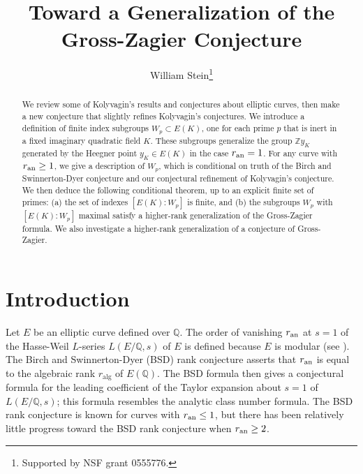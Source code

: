 \documentclass{oupau}
\DeclareMathOperator{\alg}{alg}
\newcommand{\an}{{\rm an}}
\newcommand{\QQ}{\mathbb{Q}}
\newcommand{\ZZ}{\mathbb{Z}}
\begin{document}

\title{Toward a Generalization of the Gross-Zagier Conjecture} \author{William
  Stein\footnote{Supported by NSF grant 0555776.}}
\address{}


\begin{abstract}
 
  We review some of Kolyvagin's results and conjectures about elliptic
  curves, then make a new conjecture that slightly refines Kolyvagin's
  conjectures.  We introduce a definition of finite index subgroups
  $W_p \subset E(K)$, one for each prime $p$ that is inert in a fixed
  imaginary quadratic field $K$.  These subgroups generalize the group
  $\ZZ y_K$ generated by the Heegner point $y_K \in E(K)$ in the case
  $r_{\an} = 1$.  For any curve with $r_{\an}\geq 1$, we give a
  description of $W_p$, which is conditional on truth of the Birch and
  Swinnerton-Dyer conjecture and our conjectural refinement of
  Kolyvagin's conjecture.  We then deduce the following conditional
  theorem, up to an explicit finite set of primes: (a) the set of
  indexes $[E(K):W_p]$ is finite, and (b) the subgroups $W_p$ with
  $[E(K):W_p]$ maximal satisfy a higher-rank generalization of the
  Gross-Zagier formula.  We also investigate a higher-rank
  generalization of a conjecture of Gross-Zagier.

\end{abstract}


\received{}
\maketitle

\section{Introduction}\label{sec:intro}
Let $E$ be an elliptic curve defined over $\QQ$.  
The order of vanishing $r_{\an}$ at $s=1$ of the Hasse-Weil 
$L$-series $L(E/\QQ,s)$ of $E$ is defined because $E$ is modular 
(see \cite{breuil-conrad-diamond-taylor, wiles:fermat}).
The Birch and
Swinnerton-Dyer (BSD) rank conjecture \cite{birch:edsac} asserts that
$r_{\an}$ is equal to  the algebraic rank $r_{\alg}$ of $E(\QQ)$.
The BSD formula then gives a conjectural formula for the
leading coefficient of the Taylor expansion about $s=1$ of
$L(E/\QQ,s)$; this formula resembles the analytic class number formula.  The
BSD rank conjecture is known for curves with $r_{\an}\leq 1$, but
there has been relatively little progress toward the BSD rank
conjecture when $r_{\an} \geq 2$.
\end{document}
